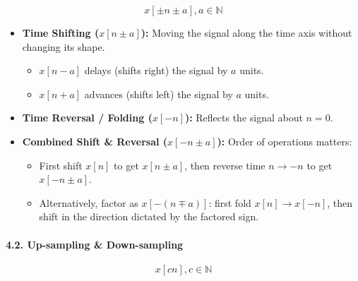 \[
x[\pm n \pm a], a \in \mathbb{N}
\]

\begin{itemize}
\tightlist
\item
  \textbf{Time Shifting (\(x[n \pm a]\)):} Moving the signal along the
  time axis without changing its shape.

  \begin{itemize}
  \tightlist
  \item
    \(x[n - a]\) delays (shifts right) the signal by \(a\) units.
  \item
    \(x[n + a]\) advances (shifts left) the signal by \(a\) units.
  \end{itemize}
\item
  \textbf{Time Reversal / Folding (\(x[-n]\)):} Reflects the signal
  about \(n = 0\).
\item
  \textbf{Combined Shift \& Reversal (\(x[-n \pm a]\)):} Order of
  operations matters:

  \begin{itemize}
  \tightlist
  \item
    First shift \(x[n]\) to get \(x[n \pm a]\), then reverse time
    \(n \to -n\) to get \(x[-n \pm a]\).
  \item
    Alternatively, factor as \(x[-(n \mp a)]\): first fold
    \(x[n] \to x[-n]\), then shift in the direction dictated by the
    factored sign.
  \end{itemize}
\end{itemize}

\paragraph{4.2. Up-sampling \&
Down-sampling}\label{up-sampling-down-sampling}

\[
x[cn], c \in \mathbb{N}
\]


